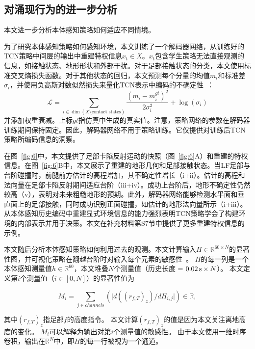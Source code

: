 \documentclass[9pt,twocolumn,twoside]{osajnl}
\begin{document}
\subsection*{对涌现行为的进一步分析}\label{supp:foot-trapping}
本文进一步分析本体感知策略如何适应不同情境。

为了研究本体感知策略如何感知环境，本文训练了一个解码器网络，从训练好的TCN策略中间层的输出中重建特权信息$x_t\in X$。$x_t$包含学生策略无法直接观测的信息，如接触状态、地形形状和外部干扰。对于足部接触状态的分类，本文使用标准交叉熵损失函数。对于其他状态的回归，本文预测每个分量的均值$m_i$和标准差$\sigma_i$，并使用负高斯对数似然损失来量化TCN表示中编码的不确定性~\cite{kendall2017uncertainties}：
\begin{equation}
    \mathcal{L} = \sum_{i \in \dim (X \setminus \text{contact states})} \frac{(m_i-m_i^{gt})^2}{2\sigma_i^2} + \log(\sigma_i)
\end{equation} 并添加权重衰减。上标$gt$指仿真中生成的真实值。注意，策略网络的参数在解码器训练期间保持固定。因此，解码器网络不用于策略训练。它仅提供对训练后TCN策略所编码信息的洞察。

在图~\ref{fig:6}中，本文提供了足部卡陷反射运动的快照（图~\ref{fig:6}A）和重建的特权信息。在图~\ref{fig:6}B中，本文展示了重建的地形几何和足部接触状态。当LF足部与台阶碰撞时，前腿前方估计的高程增加，其不确定性增长（i+ii）。估计的高程和法向量在足部卡陷反射期间适应台阶（iii+iv）。成功上台阶后，地形不确定性仍然较高（v），表明对未来粗糙地形的预期。此外，解码器网络能够检测水平面和垂直面上的足部接触，同时成功识别正面碰撞，如估计的地形法向量所示（i+iii）。从本体感知历史编码中重建显式环境信息的能力强烈表明TCN策略学会了构建环境的内部表示并用于决策。本文在补充材料第S7节中提供了更多重建特权信息的示例。

本文随后分析本体感知策略如何利用过去的观测。本文计算输入$H \in \mathbb{R}^{60 \times N}$的显著性图，并可视化策略在翻越台阶时对输入每个元素的敏感性~\cite{simonyan2013deep}。
$H$的每一列是一个本体感知测量值$h \in \mathbb{R}^{60}$，本文堆叠$N$个测量值（历史长度 = $\unit[0.02]{s}\times N$）。
本文定义第$i$个测量值（$i \in [0, N]$）的显著性值为

\begin{equation}
    M_i = \sum_{j \in channels}(\lvert d((r_{f,T})_z)/dH_{i,j} \rvert) \in \mathbb{R},
\end{equation}

其中$(r_{f,T})_z$指足部$f$的高度指令。
本文计算$(r_{f,T})_z$的值是因为本文关注离地高度的变化。
$M_i$可以解释为输出对第$i$个测量值的敏感性。
由于本文使用一维时序卷积，输出在$\mathbb{R}^{N}$中，即$H$的每一行被视为一个通道。
\end{document}

